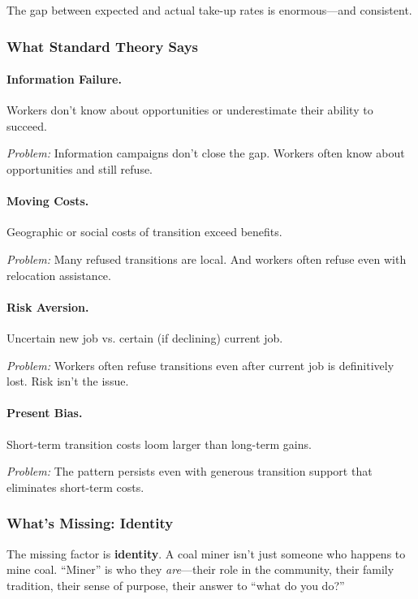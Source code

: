 The gap between expected and actual take-up rates is enormous---and consistent.

\subsubsection{What Standard Theory Says}

\paragraph{Information Failure.}
Workers don't know about opportunities or underestimate their ability to succeed.

\textit{Problem:} Information campaigns don't close the gap. Workers often 
know about opportunities and still refuse.

\paragraph{Moving Costs.}
Geographic or social costs of transition exceed benefits.

\textit{Problem:} Many refused transitions are local. And workers often 
refuse even with relocation assistance.

\paragraph{Risk Aversion.}
Uncertain new job vs. certain (if declining) current job.

\textit{Problem:} Workers often refuse transitions even after current 
job is definitively lost. Risk isn't the issue.

\paragraph{Present Bias.}
Short-term transition costs loom larger than long-term gains.

\textit{Problem:} The pattern persists even with generous transition 
support that eliminates short-term costs.

\subsubsection{What's Missing: Identity}

The missing factor is \textbf{identity}. A coal miner isn't just someone 
who happens to mine coal. ``Miner'' is who they \emph{are}---their role in 
the community, their family tradition, their sense of purpose, their answer 
to ``what do you do?''

